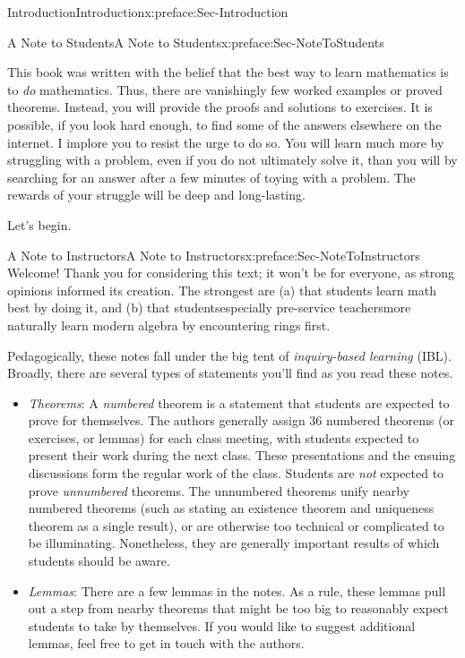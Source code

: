 \documentclass[oneside,10pt,]{book}
\numberwithin{equation}{section}
\begin{document}
\begin{preface}{Introduction}{}{Introduction}{}{}{x:preface:Sec-Introduction}
\begin{preface}{A Note to Students}{}{A Note to Students}{}{}{x:preface:Sec-NoteToStudents}
\par
This book was written with the belief that the best way to learn mathematics is to \emph{do} mathematics. Thus, there are vanishingly few worked examples or proved theorems. Instead, you will provide the proofs and solutions to exercises. It is possible, if you look hard enough, to find some of the answers elsewhere on the internet. I implore you to resist the urge to do so. You will learn much more by struggling with a problem, even if you do not ultimately solve it, than you will by searching for an answer after a few minutes of toying with a problem. The rewards of your struggle will be deep and long-lasting.%
\par
Let's begin.%
\end{preface}
%
%
\typeout{************************************************}
\typeout{************************************************}
%
\begin{preface}{A Note to Instructors}{}{A Note to Instructors}{}{}{x:preface:Sec-NoteToInstructors}
Welcome! Thank you for considering this text; it won't be for everyone, as strong opinions informed its creation. The strongest are (a) that students learn math best by doing it, and (b) that students\textendash{}especially pre-service teachers\textendash{}more naturally learn modern algebra by encountering rings first.%
\par
Pedagogically, these notes fall under the big tent of \emph{inquiry-based learning} (IBL). Broadly, there are several types of statements you'll find as you read these notes.%
\begin{itemize}[label=\textbullet]
\item{}\emph{Theorems}: A \emph{numbered} theorem is a statement that students are expected to prove for themselves. The authors generally assign 3\textendash{}6 numbered theorems (or exercises, or lemmas) for each class meeting, with students expected to present their work during the next class. These presentations and the ensuing discussions form the regular work of the class. Students are \emph{not} expected to prove \emph{unnumbered} theorems. The unnumbered theorems unify nearby numbered theorems (such as stating an existence theorem and uniqueness theorem as a single result), or are otherwise too technical or complicated to be illuminating. Nonetheless, they are generally important results of which students should be aware.%
\item{}\emph{Lemmas}: There are a few lemmas in the notes. As a rule, these lemmas pull out a step from nearby theorems that might be too big to reasonably expect students to take by themselves. If you would like to suggest additional lemmas, feel free to get in touch with the authors.%

\end{itemize}
\end{preface}
\end{preface}
\end{document}
